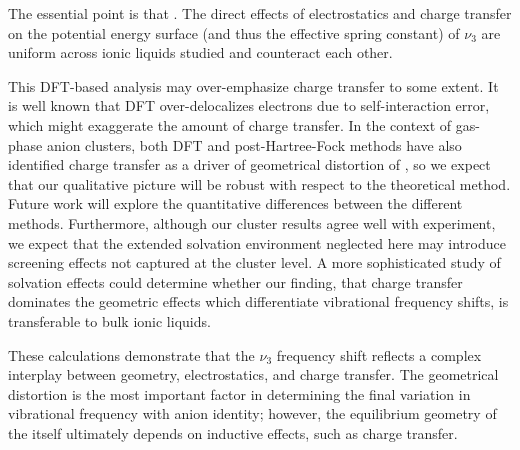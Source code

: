 \documentclass[%
  class = book,%
  crop = false,%
  float = true,%
  multi = true,%
  preview = false,%
]{standalone}
\let\cite\autocite
\begin{document}
{The essential point is that . The direct effects of electrostatics and charge transfer on the potential energy surface (and thus the effective spring constant) of \(\nu_3\) are uniform across ionic liquids studied and counteract each other.

This DFT-based analysis may over-emphasize charge transfer to some extent. It is well known that DFT over-delocalizes electrons due to self-interaction error, which might exaggerate the amount of charge transfer. In the context of gas-phase anion clusters, both DFT\cite{breen-JPCA12} and post-Hartree-Fock methods\cite{Muraoka2009} have also identified charge transfer as a driver of geometrical distortion of , so we expect that our qualitative picture will be robust with respect to the theoretical method. Future work will explore the quantitative differences between the different methods. Furthermore, although our cluster results agree well with experiment, we expect that the extended solvation environment neglected here may introduce screening effects not captured at the cluster level.\cite{Lee2011a}  A more sophisticated study of solvation effects could determine whether our finding, that charge transfer dominates the geometric effects which differentiate  vibrational frequency shifts, is transferable to bulk ionic liquids.

These calculations demonstrate that the \(\nu_3\) frequency shift reflects a complex interplay between geometry, electrostatics, and charge transfer. The geometrical distortion is the most important factor in determining the final variation in vibrational frequency with anion identity; however, the equilibrium geometry of the  itself ultimately depends on inductive effects, such as charge transfer.

}
\end{document}
